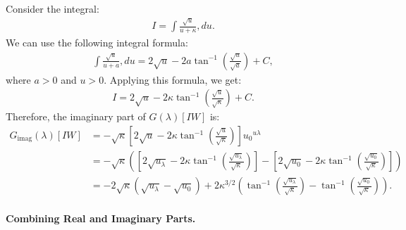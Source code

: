 Consider the integral:
\begin{align}
I = \int \frac{ \sqrt{ u } }{ u + \kappa } , du.
\end{align}
%
We can use the following integral formula:
\begin{align}
\int \frac{ \sqrt{ u } }{ u + a } , du = 2 \sqrt{ u } - 2 a \tan^{-1} \left( \frac{ \sqrt{ u } }{ \sqrt{ a } } \right ) + C,
\end{align}
where $a > 0$ and $u > 0$.
%
Applying this formula, we get:
\begin{align}
I = 2 \sqrt{ u } - 2 \kappa \tan^{-1} \left( \frac{ \sqrt{ u } }{ \sqrt{ \kappa } } \right ) + C.
\end{align}
%
Therefore, the imaginary part of $G(\lambda)[IW]$ is:
\begin{align}
\nonumber
G_{\text{imag}}(\lambda)[IW] 
   &= - \sqrt{ \kappa } \left[ 2 \sqrt{ u } - 2 \kappa \tan^{-1} \left( \frac{ \sqrt{ u } }{ \sqrt{ \kappa } } \right ) \right ]{u_0}^{u\lambda} \\
\nonumber
   &= - \sqrt{ \kappa } \left( \left[ 2 \sqrt{ u_\lambda } - 2 \kappa \tan^{-1} \left( \frac{ \sqrt{ u_\lambda } }{ \sqrt{ \kappa } } \right ) \right ] - \left[ 2 \sqrt{ u_0 } - 2 \kappa \tan^{-1} \left( \frac{ \sqrt{ u_0 } }{ \sqrt{ \kappa } } \right ) \right ] \right ) \\
   &= - 2 \sqrt{ \kappa } \left( \sqrt{ u_\lambda } - \sqrt{ u_0 } \right ) + 2 \kappa^{ 3/2 } \left( \tan^{-1} \left( \frac{ \sqrt{ u_\lambda } }{ \sqrt{ \kappa } } \right ) - \tan^{-1} \left( \frac{ \sqrt{ u_0 } }{ \sqrt{ \kappa } } \right ) \right ).
\end{align}


\paragraph{Combining Real and Imaginary Parts.}

